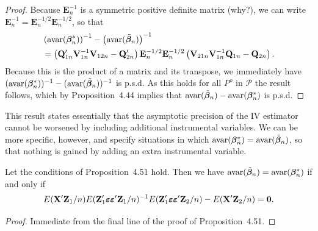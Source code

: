 \begin{proof}
Because $\mathbf{E}_n^{-1}$ is a symmetric positive definite matrix (why?), we can write
$\mathbf{E}_n^{-1} = \mathbf{E}_n^{-1/2}\mathbf{E}_n^{-1/2}$, so that
\begin{align*}
&\left(\mathrm{avar}(\boldsymbol{\beta}_n^*)\right)^{-1} - \left(\mathrm{avar}(\tilde{\boldsymbol{\beta}}_n)\right)^{-1} \\
&= \left(\mathbf{Q}_{1n}'\mathbf{V}_{1n}^{-1}\mathbf{V}_{12n} - \mathbf{Q}_{2n}'\right)\mathbf{E}_n^{-1/2}\mathbf{E}_n^{-1/2}\left(\mathbf{V}_{21n}\mathbf{V}_{1n}^{-1}\mathbf{Q}_{1n} - \mathbf{Q}_{2n}\right).
\end{align*}
Because this is the product of a matrix and its transpose, we immediately
have $(\mathrm{avar}(\boldsymbol{\beta}_n^*))^{-1} - (\mathrm{avar}(\tilde{\boldsymbol{\beta}}_n))^{-1}$ is p.s.d. As this holds for all $P^o$ in $\mathcal{P}$ the
result follows, which by Proposition~4.44 implies that $\mathrm{avar}(\tilde{\boldsymbol{\beta}}_n) - \mathrm{avar}(\boldsymbol{\beta}_n^*)$
is p.s.d.
\end{proof}

This result states essentially that the asymptotic precision of the IV
estimator cannot be worsened by including additional instrumental variables. We can be more specific, however, and specify situations in which
$\mathrm{avar}(\boldsymbol{\beta}_n^*) = \mathrm{avar}(\tilde{\boldsymbol{\beta}}_n)$, so that nothing is gained by adding an extra instrumental variable.

\begin{proposition}\label{prop:4.52}
Let the conditions of Proposition~4.51 hold. Then we have $\mathrm{avar}(\tilde{\boldsymbol{\beta}}_n) = \mathrm{avar}(\boldsymbol{\beta}_n^*)$ if and only if
\[
E(\mathbf{X}'\mathbf{Z}_1/n)E(\mathbf{Z}_1'\boldsymbol{\varepsilon}\boldsymbol{\varepsilon}'\mathbf{Z}_1/n)^{-1}E(\mathbf{Z}_1'\boldsymbol{\varepsilon}\boldsymbol{\varepsilon}'\mathbf{Z}_2/n) - E(\mathbf{X}'\mathbf{Z}_2/n) = \mathbf{0}.
\]
\end{proposition}

\begin{proof}
Immediate from the final line of the proof of Proposition~4.51.
\end{proof}

